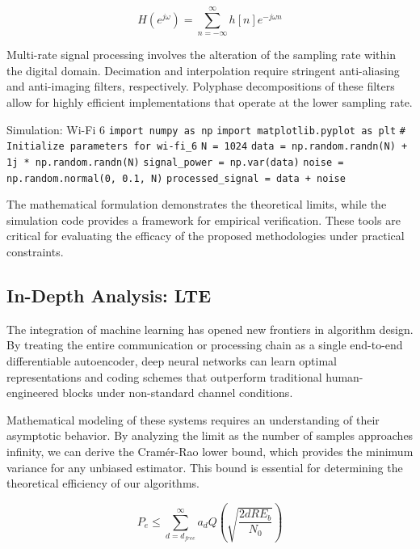 \begin{equation}
    H(e^{j\omega}) = \sum_{n=-\infty}^{\infty} h[n] e^{-j\omega n}
\end{equation}

Multi-rate signal processing involves the alteration of the sampling rate within the digital domain. Decimation and interpolation require stringent anti-aliasing and anti-imaging filters, respectively. Polyphase decompositions of these filters allow for highly efficient implementations that operate at the lower sampling rate.

\begin{pythonbox}{Simulation: Wi-Fi 6}
\texttt{import numpy as np}
\texttt{import matplotlib.pyplot as plt}
\texttt{}
\texttt{\# Initialize parameters for wi-fi\_6}
\texttt{N = 1024}
\texttt{data = np.random.randn(N) + 1j * np.random.randn(N)}
\texttt{signal\_power = np.var(data)}
\texttt{noise = np.random.normal(0, 0.1, N)}
\texttt{processed\_signal = data + noise}
\end{pythonbox}

\vspace{0.5cm}
The mathematical formulation demonstrates the theoretical limits, while the simulation code provides a framework for empirical verification. These tools are critical for evaluating the efficacy of the proposed methodologies under practical constraints.


\subsection{In-Depth Analysis: LTE}
The integration of machine learning has opened new frontiers in algorithm design. By treating the entire communication or processing chain as a single end-to-end differentiable autoencoder, deep neural networks can learn optimal representations and coding schemes that outperform traditional human-engineered blocks under non-standard channel conditions.

Mathematical modeling of these systems requires an understanding of their asymptotic behavior. By analyzing the limit as the number of samples approaches infinity, we can derive the Cramér-Rao lower bound, which provides the minimum variance for any unbiased estimator. This bound is essential for determining the theoretical efficiency of our algorithms.

\begin{equation}
    P_e \leq \sum_{d=d_{free}}^{\infty} a_d Q\left(\sqrt{\frac{2 d R E_b}{N_0}}\right)
\end{equation}

